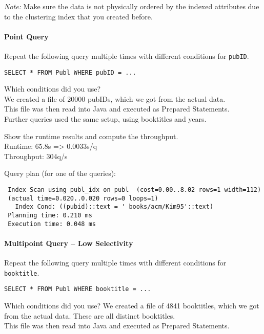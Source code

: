 \documentclass[11pt]{scrartcl}
\begin{document}
\noindent \emph{Note:} Make sure the data is not physically ordered by
the indexed attributes due to the clustering index that you created
before.

\paragraph{Point Query}

Repeat the following query multiple times with different conditions for {\tt pubID}.

{\small
\begin{verbatim}
SELECT * FROM Publ WHERE pubID = ...
\end{verbatim}
}

\noindent
Which conditions did you use?\\
We created a file of 20000 pubIDs, which we got from the actual data.\\
This file was then read into Java and executed as Prepared Statements.\\
Further queries used the same setup, using booktitles and years.

\smallskip\noindent
Show the runtime results and compute the throughput.\\
Runtime: 65.8s => 0.0033s/q\\
Throughput: 304q/s

\smallskip\noindent
Query plan (for one of the queries):
{\small
\begin{verbatim}
 Index Scan using publ_idx on publ  (cost=0.00..8.02 rows=1 width=112)
 (actual time=0.020..0.020 rows=0 loops=1)
   Index Cond: ((pubid)::text = ' books/acm/Kim95'::text)
 Planning time: 0.210 ms
 Execution time: 0.048 ms
\end{verbatim}
}


\paragraph{Multipoint Query -- Low Selectivity}

Repeat the following query multiple times with different conditions for {\tt booktitle}.

{\small
\begin{verbatim}
SELECT * FROM Publ WHERE booktitle = ...
\end{verbatim}
}

\noindent
Which conditions did you use?
We created a file of 4841 booktitles, which we got from the actual data. These are all distinct booktitles.\\
This file was then read into Java and executed as Prepared Statements.
\end{document}
